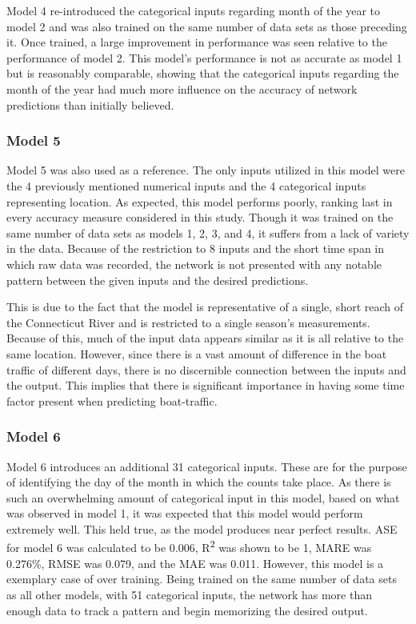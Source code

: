 \documentclass[
10pt, %
letterpaper, %
twoside, %
headinclude,footinclude, %
BCOR5mm, %
]{scrartcl}
\def\SP#1{\textsuperscript{\textcolor{black}{#1}}}
\begin{document}
Model 4 re-introduced the categorical inputs regarding month of the year to model 2 and was also trained on the same number of data sets as those preceding it. Once trained, a large improvement in performance was seen relative to the performance of model 2. This model's performance is not as accurate as model 1 but is reasonably comparable, showing that the categorical inputs regarding the month of the year had much more influence on the accuracy of network predictions than initially believed.
 
\subsubsection{Model 5}

Model 5 was also used as a reference. The only inputs utilized in this model were the 4 previously mentioned numerical inputs and the 4 categorical inputs representing location. As expected, this model performs poorly, ranking last in every accuracy measure considered in this study. Though it was trained on the same number of data sets as models 1, 2, 3, and 4, it suffers from a lack of variety in the data. Because of the restriction to 8 inputs and the short time span in which raw data was recorded, the network is not presented with any notable pattern between the given inputs and the desired predictions. 

This is due to the fact that the model is representative of a single, short reach of the Connecticut River and is restricted to a single season's measurements. Because of this, much of the input data appears similar as it is all relative to the same location. However, since there is a vast amount of difference in the boat traffic of different days, there is no discernible connection between the inputs and the output. This implies that there is significant importance in having some time factor present when predicting boat-traffic.

\subsubsection{Model 6}

Model 6 introduces an additional 31 categorical inputs. These are for the purpose of identifying the day of the month in which the counts take place. As there is such an overwhelming amount of categorical input in this model, based on what was observed in model 1, it was expected that this model would perform extremely well. This held true, as the model produces near perfect results. ASE for model 6 was calculated to be 0.006, R\SP{2} was shown to be 1, MARE was 0.276\%, RMSE was 0.079, and the MAE was 0.011. However, this model is a exemplary case of over training. Being trained on the same number of data sets as all other models, with 51 categorical inputs, the network has more than enough data to track a pattern and begin memorizing the desired output.
\end{document}
